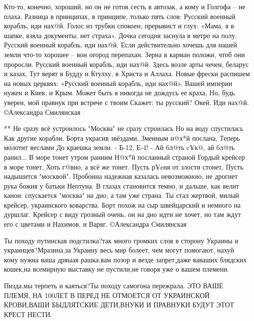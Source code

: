 Кто-то, конечно, хороший, но он не готов
сесть в автозак, а кому и Голгофа – не плаха.
Разница в принципах, в принципе, только пять слов:
Русский военный корабль, иди нах@й.
Голос из трубки спокоен, прерывист и глух:
«Мама, я в шапке, взяла документы, нет страха».
Дочка сегодня заснула в метро на полу.
Русский военный корабль, иди нах@й.
Если действительно хочешь для нашей земли
что-то хорошее – вон огород перепахан.
Зерна в карман положи, чтоб они проросли.
Русский военный корабль, иди нах@й.
Здесь возле арты чечен, беларус и казах,
Тут верят в Будду и Ктулху, в Христа и Аллаха.
Новые фрески распишем на новых церквях:
«Русский военный корабль, иди нах@й».
Вашей империи нужен и Киев, и Крым.
Может быть я никогда не дождусь ее краха,
Но, будь уверен, мой правнук при встрече с твоим
Скажет: ты русский?
Окей.
Иди нах@й.
©Александра Смилянская

**
Не сразу всё устроилось
"Москва" не сразу строилась
Но на воду спустилась
Как другие корабли.
Борта украсив звёздами,
Змеиным н@х*й послана,
Теперь молотит веслами
До краешка земли.
- Б-12, Е-4!
- Ай 6л@ть c¥к@, ай 6л@ть ранил...
В море тонет утром ранним
Н@х*й посланный страной
Гордый крейсер в море тонет,
Хоть г@вно, а всё же тонет.
Пусть р¥¢ня от злости стонет,
Пусть надышится "москвой".
Пробоина надежная
казалась невозможною,
не дрогнет рука божия
у батьки Нептуна.
В глазах становится темно,
и дальше, как велит канон:
спускается "москва" на дно,
а там уже страна.
Ты стал жертвой, милый крейсер,
украинского коварства.
Борт похож на сыр швейцарский
и немного на дуршлаг.
Крейсер с виду грозный очень,
он на дно идти не хочет,
но там ждут его с цветами
и Нахимов, и Варяг.
©Александра Смилянская

Ты походу путинская подстилка?так много громких слов в сторону Украины и
украинцев?Мразина,за Украину весь мир болеет, чем могут помогают, нахуй кому
нужна ваша дряыая рашка,вам позор и везде запрет,даже ваваших блядских кошек,на
всемирную выставку не пустили,не говоря уже о вашем племени.

Пизда,мы терпеть и каяться?Ты походу самогона пережрала. ЭТО ВАШЕ ПЛЕМЯ, НА
100ЛЕТ В ПЕРЕД НЕ ОТМОЕТСЯ ОТ УКРАИНСКОЙ КРОВИ,ВАШИ БЫДЛЯТСКИЕ ДЕТИ,ВНУКИ И
ПРАВНУКИ БУДУТ ЭТОТ КРЕСТ НЕСТИ.

